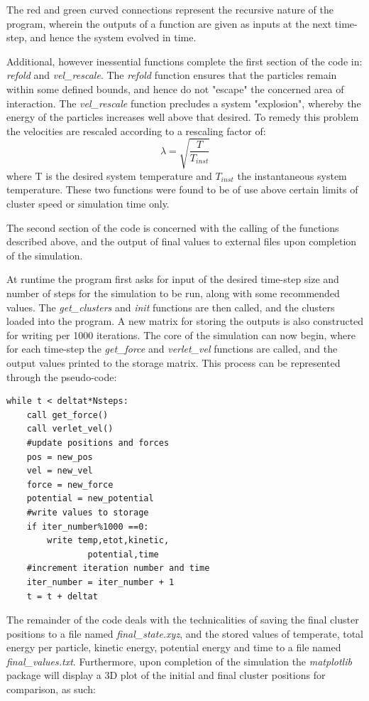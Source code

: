 \documentclass{article}
\begin{document}
\begin{multicols}{2}
	
	The red and green curved connections represent the recursive nature of the program, wherein the outputs of a function are given as inputs at the next time-step, and hence the system evolved in time.


Additional, however inessential functions complete the first section of the code in: \textit{refold} and \textit{vel\_rescale}. The \textit{refold} function ensures that the particles remain within some defined bounds, and hence do not "escape" the concerned area of interaction. The \textit{vel\_rescale} function precludes a system "explosion", whereby the energy of the particles increases well above that desired. To remedy this problem the velocities are rescaled \cite{shell} \cite{frenkel} according to a rescaling factor of:\[\lambda = \sqrt{ \frac{T}{T_{inst}}}\]
where T is the desired system temperature and $T_{inst}$ the instantaneous system temperature. These two functions were found to be of use above certain limits of cluster speed or simulation time only.

	The second section of the code is concerned with the calling of the functions described above, and the output of final values to external files upon completion of the simulation. 
	
	At runtime the program first asks for input of the desired time-step size and number of steps for the simulation to be run, along with some recommended values. The \textit{get\_clusters} and \textit{init} functions are then called, and the clusters loaded into the program. A new matrix for storing the outputs is also constructed for writing per 1000 iterations. The core of the simulation can now begin, where for each time-step the \textit{get\_force} and \textit{verlet\_vel} functions are called, and the output values printed to the storage matrix. This process can be represented through the pseudo-code: 
	\captionsetup[lstlisting]{position=bottom,font=footnotesize}
\renewcommand{\lstlistingname}{Code}
\begin{lstlisting}
while t < deltat*Nsteps:
	call get_force()
	call verlet_vel()
	#update positions and forces
	pos = new_pos
	vel = new_vel
	force = new_force
	potential = new_potential
	#write values to storage
	if iter_number%1000 ==0:
		write temp,etot,kinetic,
				potential,time
	#increment iteration number and time
	iter_number = iter_number + 1
	t = t + deltat
\end{lstlisting}

The remainder of the code deals with the technicalities of saving the final cluster positions to a file named \textit{final\_state.xyz}, and the stored values of temperate, total energy per particle, kinetic energy, potential energy and time to a file named \textit{final\_values.txt}.
Furthermore, upon completion of the simulation the \textit{matplotlib} package will display a 3D plot of the initial and final cluster positions for comparison, as such:


\end{multicols}
\end{document}
